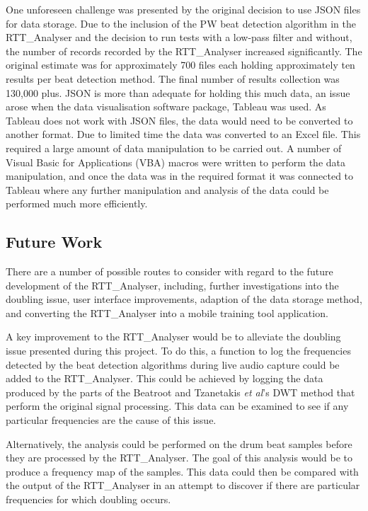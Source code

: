 \documentclass[a4paper, 11pt]{article}
\begin{document}
One unforeseen challenge was presented by the original decision to use JSON files for data storage. Due to the inclusion of the PW beat detection algorithm in the RTT\_Analyser and the decision to run tests with a low-pass filter and without, the number of records recorded by the RTT\_Analyser increased significantly. The original estimate was for approximately 700 files each holding approximately ten results per beat detection method. The final number of results collection was 130,000 plus. JSON is more than adequate for holding this much data, an issue arose when the data visualisation software package, Tableau\cite{tableau} was used. As Tableau does not work with JSON files, the data would need to be converted to another format. Due to limited time the data was converted to an Excel\cite{excel} file. This required a large amount of data manipulation to be carried out. A number of Visual Basic for Applications (VBA) macros were written to perform the data manipulation, and once the data was in the required format it was connected to Tableau where any further manipulation and analysis of the data could be performed much more efficiently. 


\subsection{Future Work}
There are a number of possible routes to consider with regard to the future development of the RTT\_Analyser, including, further investigations into the doubling issue, user interface improvements, adaption of the data storage method, and converting the RTT\_Analyser into a mobile training tool application.\par

A key improvement to the RTT\_Analyser would be to alleviate the doubling issue presented during this project. To do this, a function to log the frequencies detected by the beat detection algorithms during live audio capture could be added to the RTT\_Analyser. This could be achieved by logging the data produced by the parts of the Beatroot and Tzanetakis \textit{et al}'s \cite{tzane1} DWT method that perform the original signal processing. This data can be examined to see if any particular frequencies are the cause of this issue.\par

Alternatively, the analysis could be performed on the drum beat samples before they are processed by the RTT\_Analyser. The goal of this analysis would be to produce a frequency map of the samples. This data could then be compared with the output of the RTT\_Analyser in an attempt to discover if there are particular frequencies for which doubling occurs.\par
\end{document}
